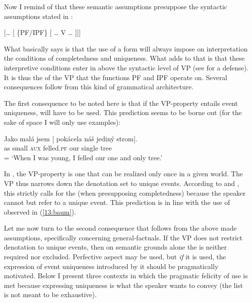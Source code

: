 \documentclass[output=paper,modfonts,newtxmath,hidelinks]{langscibook}
\begin{document}
\noindent Now I remind of that these semantic assumptions presuppose the syntactic assumptions stated in :

\begin{exe}
\ex\label{13:synas}
{} [{\dots} [ \{PF/IPF\} [ {\dots} V {\dots} ]]]
\end{exe}

\noindent What  basically says is that the use of a  form will always impose on interpretation the conditions of completedness
and uniqueness. What  adds to that is that these interpretive conditions enter in above the syntactic level of VP (see \citealt{Tate11,Tate13} for a defense). It is thus the  of the VP that the functions PF and IPF operate on. Several consequences follow from this kind of grammatical architecture.

The first consequence to be noted here is that if the VP-property entails event uniqueness,  will have to be used.
This prediction seems to be borne out (for the sake of space I will only use  examples):

\begin{exe}
\ex\label{13:baum}
\gll Jako mal\'a jsem [ pok\'acela n\'a\v{s} jedin\'y strom].\\
as small \textsc{aux} {} felled.\textsc{pf} our single tree \\\hfill = 
\glt `When I was young, I felled our one and only tree.'
\end{exe}

\noindent In , the VP-property is one that can be realized only once in a given world. The VP thus narrows down the denotation set to unique events. According to  and , this strictly calls for the  (when presupposing completedness) because the speaker cannot but refer to a unique event. This prediction is in line with the use of  observed in (\ref{13:baum}).


Let me now turn to the second consequence that follows from the above made assumptions, specifically concerning general-factuals. If the VP does not restrict denotation to unique events, then on semantic grounds alone the  is neither required nor excluded. Perfective aspect may be used, but \textit{if} it is used, the expression of event uniqueness introduced by it should be pragmatically motivated. Below I present three contexts in which the pragmatic felicity of  use is met because expressing uniqueness is what the speaker wants to convey (the list is not meant to be exhaustive).
\end{document}
